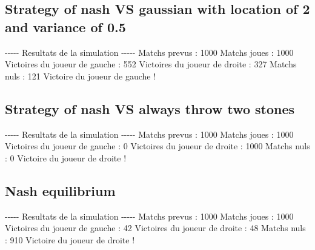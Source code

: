 \documentclass{article}%
\begin{document}
%
\subsection{Strategy of nash VS gaussian with location of 2 and variance of 0.5}%
\label{subsec:Strategy of nash VS gaussian with location of 2 and variance of 0.5}%
{-}{-}{-}{-}{-} Resultats de la simulation {-}{-}{-}{-}{-}\newline%
		\newline%
Matchs prevus : 1000\newline%
Matchs joues : 1000\newline%
\newline%
Victoires du joueur de gauche : 552\newline%
Victoires du joueur de droite : 327\newline%
Matchs nuls : 121\newline%
\newline%
Victoire du joueur de gauche !

%
\subsection{Strategy of nash VS always throw two stones}%
\label{subsec:Strategy of nash VS always throw two stones}%
{-}{-}{-}{-}{-} Resultats de la simulation {-}{-}{-}{-}{-}\newline%
		\newline%
Matchs prevus : 1000\newline%
Matchs joues : 1000\newline%
\newline%
Victoires du joueur de gauche : 0\newline%
Victoires du joueur de droite : 1000\newline%
Matchs nuls : 0\newline%
\newline%
Victoire du joueur de droite !

%
\subsection{Nash equilibrium}%
\label{subsec:Nash equilibrium}%
{-}{-}{-}{-}{-} Resultats de la simulation {-}{-}{-}{-}{-}\newline%
		\newline%
Matchs prevus : 1000\newline%
Matchs joues : 1000\newline%
\newline%
Victoires du joueur de gauche : 42\newline%
Victoires du joueur de droite : 48\newline%
Matchs nuls : 910\newline%
\newline%
Victoire du joueur de droite !
\end{document}
